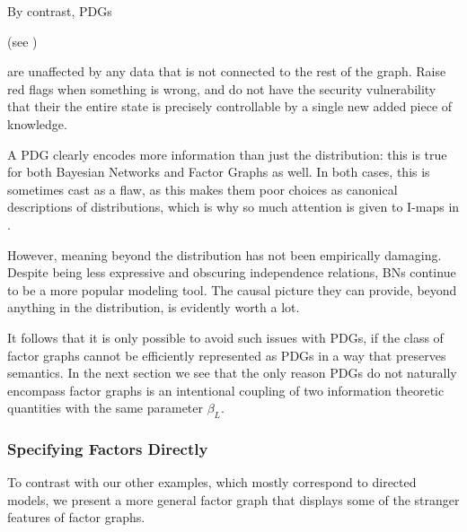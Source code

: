 \documentclass{article}
\theoremstyle{plain}
\theoremstyle{definition}
\newenvironment{example}
	{\pushQED{\qed}\renewcommand{\qedsymbol}{$\triangle$}\examplex}
	{\popQED\endexamplex%
}
\theoremstyle{remark}
\numberwithin{equation}{section}
\begin{document}
	By contrast, PDGs
	\begin{vfull}
	(see )
	\end{vfull}
	are unaffected by any data that is not connected to the rest of the graph. Raise red flags when something is wrong, and do not have the security vulnerability that their the entire state is precisely controllable by a single new added piece of knowledge.
	\begin{vfull}
		A PDG clearly encodes more information than just the distribution: this is true for both Bayesian Networks and Factor Graphs as well. In both cases, this is sometimes cast as a flaw, as this makes them poor choices as canonical descriptions of distributions, which is why so much attention is given to I-maps in \cite{koller2009probabilistic}. 
		
		However, meaning beyond the distribution has not been empirically damaging. Despite being less expressive and obscuring independence relations, BNs continue to be a more popular modeling tool. The causal picture they can provide, beyond anything in the distribution, is evidently worth a lot.
	\end{vfull}
	It follows that it is only possible to avoid such issues with PDGs, if the class of factor graphs cannot be efficiently represented as PDGs in a way that preserves semantics.
	In the next section we see that the only reason PDGs do not naturally encompass factor graphs is an intentional coupling of two information theoretic quantities with the same parameter $\beta_L$. 

	\subsubsection{Specifying Factors Directly}
%


		To contrast with our other examples, which mostly correspond to directed models, we present a more general factor graph that displays some of the stranger features of factor graphs.
\end{document}
